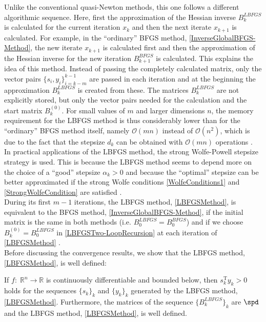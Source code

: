 Unlike the conventional quasi-Newton methods, this one follows a different algorithmic sequence. Here, first the approximation of the Hessian inverse $B^{LBFGS}_k$ is calculated for the current iteration $x_k$ and then the next iterate $x_{k+1}$ is calculated. For example, in the “ordinary” BFGS method, \cref{InverseGlobalBFGS-Method}, the new iterate $x_{k+1}$ is calculated first and then the approximation of the Hessian inverse for the new iteration $B^{BFGS}_{k+1}$ is calculated. This explains the idea of this method. Instead of passing the completely calculated matrix, only the vector pairs $\{ s_i, y_i\}_{i=k-m}^{k-1}$ are passed in each iteration and at the beginning the approximation $B^{LBFGS}_k$ is created from these. The matrices $B^{LBFGS}_k$ are not explicitly stored, but only the vector pairs needed for the calculation and the start matrix $B^{(0)}_k$. For small values of $m$ and larger dimensions $n$, the memory requirement for the LBFGS method is thus considerably lower than for the “ordinary” BFGS method itself, namely $\mathcal{O}(mn)$ instead of $\mathcal{O}(n^2)$, which is due to the fact that the stepsize $d_k$ can be obtained with $\mathcal{O}(mn)$ operations \cite[p.~200-201]{GeigerKanzow:1999}. \\
In practical applications of the LBFGS method, the strong Wolfe-Powell stepsize strategy is used. This is because the LBFGS method seems to depend more on the choice of a “good” stepsize $\alpha_k > 0$ and because the “optimal” stepsize can be better approximated if the strong Wolfe conditions \cref{WolfeConditions1} and \cref{StrongWolfeCondition} are satisfied \cite[p.~212-213]{GeigerKanzow:1999}. \\ 
During its first $m − 1$ iterations, the LBFGS method, \cref{LBFGSMethod}, is equivalent to the BFGS method, \cref{InverseGlobalBFGS-Method}, if the initial matrix is the same in both methods (i.e. $B^{LBFGS}_0 = B^{BFGS}_0$) and if we choose $B^{(0)}_k = B^{LBFGS}_0$ in \cref{LBFGSTwo-LoopRecursion} at each iteration of \cref{LBFGSMethod} \cite[p.~179]{NocedalWright:2006}. \\
Before discussing the convergence results, we show that the LBFGS method, \cref{LBFGSMethod}, is well defined:

\begin{theorem} 
    If $f \colon \; \mathbb{R}^n \to \mathbb{R}$ is continuously differentiable and bounded below, then $s^{\mathrm{T}}_k y_k > 0$ holds for the sequences $\{s_k\}_k$ and $\{y_k\}_k$ generated by the LBFGS method, \cref{LBFGSMethod}. Furthermore, the matrices of the sequence $\{B^{LBFGS}_k\}_k$ are $\spd$ and the LBFGS method, \cref{LBFGSMethod}, is well defined. 
\end{theorem}

